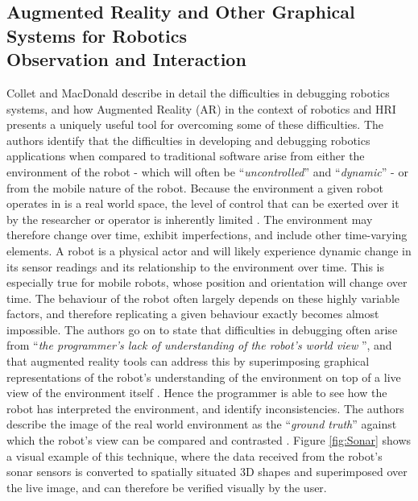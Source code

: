 \documentclass[titlepage,hidelinks,10pt]{article}
\begin{document}
\subsection{Augmented Reality and Other Graphical Systems for Robotics \\Observation and Interaction} \label{VRAndAR}
Collet and MacDonald \cite{AugmentedRealityDebuggingSystem} describe in detail the difficulties in debugging robotics systems, and how Augmented Reality (AR) in the context of robotics and HRI presents a uniquely useful tool for overcoming some of these difficulties. The authors identify that the difficulties in developing and debugging robotics applications when compared to traditional software arise from either the environment of the robot - which will often be ``\textit{uncontrolled}'' and ``\textit{dynamic}'' - or from the mobile nature of the robot. Because the environment a given robot operates in is a real world space, the level of control that can be exerted over it by the researcher or operator is inherently limited \cite{AugmentedRealityDebuggingSystem}. The environment may therefore change over time, exhibit imperfections, and include other time-varying elements. A robot is a physical actor and will likely experience dynamic change in its sensor readings and its relationship to the environment over time. This is especially true for mobile robots, whose position and orientation will change over time. The behaviour of the robot often largely depends on these highly variable factors, and therefore replicating a given behaviour exactly becomes almost impossible. The authors go on to state that difficulties in debugging often arise from ``\textit{the programmer's lack of understanding of the robot's world view} \cite{AugmentedRealityDebuggingSystem}'', and that augmented reality tools can address this by superimposing graphical representations of the robot's understanding of the environment on top of a live view of the environment itself \cite{AugmentedRealityDebuggingSystem}. Hence the programmer is able to see how the robot has interpreted the environment, and identify inconsistencies. The authors describe the image of the real world environment as the ``\textit{ground truth}'' against which the robot's view can be compared and contrasted \cite{AugmentedRealityDebuggingSystem}. Figure \ref{fig:Sonar} shows a visual example of this technique, where the data received from the robot's sonar sensors is converted to spatially situated 3D shapes and superimposed over the live image, and can therefore be verified visually by the user.
\end{document}
